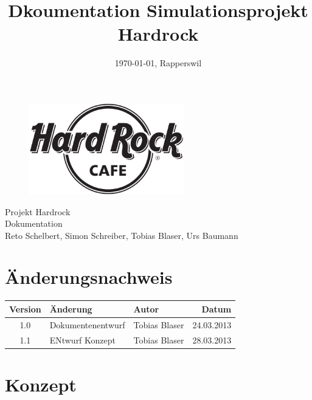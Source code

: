 \documentclass[ngerman,a4paper,12pt]{scrreprt}
\title{Dkoumentation Simulationsprojekt Hardrock}
\date{\today{}, Rapperswil}
\def\author{Reto Schelbert, Simon Schreiber, Tobias Blaser, Urs Baumann}
\begin{document}
\thispagestyle{empty}
\begin{titlepage}
	\begin{center}

	\vspace*{40mm}
	
	\begin{figure}[htp]
		\centering
		\includegraphics[width=0.60\textwidth]{img/Hard-Rock-Cafe-Logo-Black-White.png}
	\end{figure}		
	\vspace*{20mm}
	
	{\fontsize{40}{48} \selectfont Projekt Hardrock \\[10mm]}
	{\fontsize{32}{48} \selectfont Dokumentation \\[5mm]}	
	\vspace*{20mm}
	\author

\end{center}
\end{titlepage}
\clearpage

\chapter*{Änderungsnachweis}
\begin{tabularx}{\textwidth}{|cXlr|} %
		\hline
		\textbf{Version} & \textbf{Änderung} & \textbf{Autor} & \textbf{Datum}\\
		\hline
		1.0 & Dokumentenentwurf & Tobias Blaser & 24.03.2013 \\
		1.1 & ENtwurf Konzept & Tobias Blaser & 28.03.2013 \\
		\hline
\end{tabularx}

\tableofcontents


\chapter{Konzept}
\end{document}
